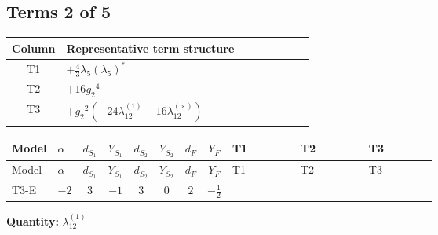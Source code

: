 \documentclass[8pt]{article}
\begin{document}
\begin{landscape}
\subsection*{Terms 2 of 5}
\begin{center}
\begin{tabular}{@{}c >{\raggedright\arraybackslash}p{0.82\linewidth}@{}}
\toprule
Column & Representative term structure \\
\midrule
T1 & \(\displaystyle +\frac{4}{3} {\lambda_5} \left({\lambda_5}\right)^{*}\) \\
\midrule
T2 & \(\displaystyle +16 {g_2}^4\) \\
\midrule
T3 & \(\displaystyle +{g_2}^2 (-24 {\lambda_{12}^{(1)}}-16 {\lambda_{12}^{(\times)}})\) \\
\midrule
\bottomrule
\end{tabular}
\end{center}
\smallskip
\tiny
\begin{longtable}{@{}llcccccc >{\raggedright\arraybackslash}p{0.21\linewidth} >{\raggedright\arraybackslash}p{0.21\linewidth} >{\raggedright\arraybackslash}p{0.21\linewidth}@{}}
\toprule
Model & $\alpha$ & $d_{S_1}$ & $Y_{S_1}$ & $d_{S_2}$ & $Y_{S_2}$ & $d_F$ & $Y_F$ & T1 & T2 & T3 \\
\midrule
\endfirsthead
\toprule
Model & $\alpha$ & $d_{S_1}$ & $Y_{S_1}$ & $d_{S_2}$ & $Y_{S_2}$ & $d_F$ & $Y_F$ & T1 & T2 & T3 \\
\midrule
\endhead
T3-E & $-2$ & $3$ & $-1$ & $3$ & $0$ & $2$ & $-\frac{1}{2}$ & \scriptsize\adjustbox{max width=\linewidth}{$\begin{gathered} +\frac{4}{3} {\lambda_5} \left({\lambda_5}\right)^{*}\end{gathered}$} & \scriptsize\adjustbox{max width=\linewidth}{$\begin{gathered} +16 {g_2}^4\end{gathered}$} & \scriptsize\adjustbox{max width=\linewidth}{$\begin{gathered} +{g_2}^2 (-24 {\lambda_{12}^{(1)}}-16 {\lambda_{12}^{(\times)}})\end{gathered}$} \\
\midrule
\bottomrule
\end{longtable}
\clearpage
\noindent\textbf{Quantity: }$\lambda_{12}^{(1)}$\par\smallskip

\end{landscape}
\end{document}
